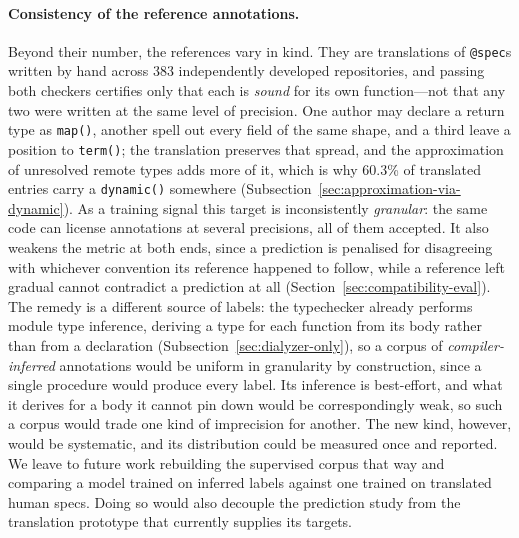 \paragraph{Consistency of the reference annotations.}
Beyond their number, the references vary in kind.
They are translations of \texttt{@spec}s written by hand across 383 independently developed repositories, and passing both checkers certifies only that each is \emph{sound} for its own function---not that any two were written at the same level of precision.
One author may declare a return type as \texttt{map()}, another spell out every field of the same shape, and a third leave a position to \texttt{term()}; the translation preserves that spread, and the approximation of unresolved remote types adds more of it, which is why \num{60.3}\% of translated entries carry a \texttt{dynamic()} somewhere (Subsection~\ref{sec:approximation-via-dynamic}).
As a training signal this target is inconsistently \emph{granular}: the same code can license annotations at several precisions, all of them accepted.
It also weakens the metric at both ends, since a prediction is penalised for disagreeing with whichever convention its reference happened to follow, while a reference left gradual cannot contradict a prediction at all (Section~\ref{sec:compatibility-eval}).
The remedy is a different source of labels: the typechecker already performs module type inference, deriving a type for each function from its body rather than from a declaration (Subsection~\ref{sec:dialyzer-only}), so a corpus of \emph{compiler-inferred} annotations would be uniform in granularity by construction, since a single procedure would produce every label.
Its inference is best-effort, and what it derives for a body it cannot pin down would be correspondingly weak, so such a corpus would trade one kind of imprecision for another. The new kind, however, would be systematic, and its distribution could be measured once and reported.
We leave to future work rebuilding the supervised corpus that way and comparing a model trained on inferred labels against one trained on translated human specs. Doing so would also decouple the prediction study from the translation prototype that currently supplies its targets.

